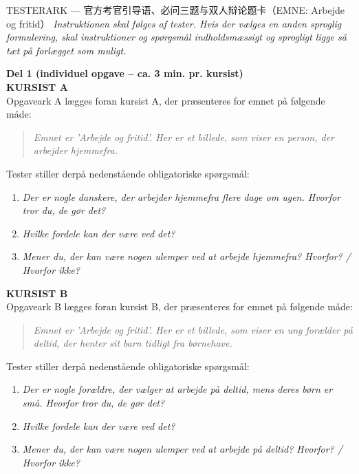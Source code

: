 \begin{emailbox}{TESTERARK --- 官方考官引导语、必问三题与双人辩论题卡（EMNE: Arbejde og fritid）}
\small\textcolor{NCDGray}{\textit{Instruktionen skal følges af tester. Hvis der vælges en anden sproglig formulering, skal instruktioner og spørgsmål indholdsmæssigt og sprogligt ligge så tæt på forlægget som muligt.}}

\vspace{0.35em}
\textbf{\color{NCDRed}Del 1 (individuel opgave -- ca. 3 min. pr. kursist)}\\
\textbf{\color{NCDNavy}KURSIST A}\\
Opgaveark A lægges foran kursist A, der præsenteres for emnet på følgende måde:
\begin{quote}
\textit{Emnet er 'Arbejde og fritid'. Her er et billede, som viser en person, der arbejder hjemmefra.}
\end{quote}
Tester stiller derpå nedenstående obligatoriske spørgsmål:
\begin{enumerate}
  \item \textit{Der er nogle danskere, der arbejder hjemmefra flere dage om ugen. Hvorfor tror du, de gør det?}
  \item \textit{Hvilke fordele kan der være ved det?}
  \item \textit{Mener du, der kan være nogen ulemper ved at arbejde hjemmefra? Hvorfor? / Hvorfor ikke?}
\end{enumerate}

\textbf{\color{NCDNavy}KURSIST B}\\
Opgaveark B lægges foran kursist B, der præsenteres for emnet på følgende måde:
\begin{quote}
\textit{Emnet er 'Arbejde og fritid'. Her er et billede, som viser en ung forælder på deltid, der henter sit barn tidligt fra børnehave.}
\end{quote}
Tester stiller derpå nedenstående obligatoriske spørgsmål:
\begin{enumerate}
  \item \textit{Der er nogle forældre, der vælger at arbejde på deltid, mens deres børn er små. Hvorfor tror du, de gør det?}
  \item \textit{Hvilke fordele kan der være ved det?}
  \item \textit{Mener du, der kan være nogen ulemper ved at arbejde på deltid? Hvorfor? / Hvorfor ikke?}
\end{enumerate}


\end{emailbox}
